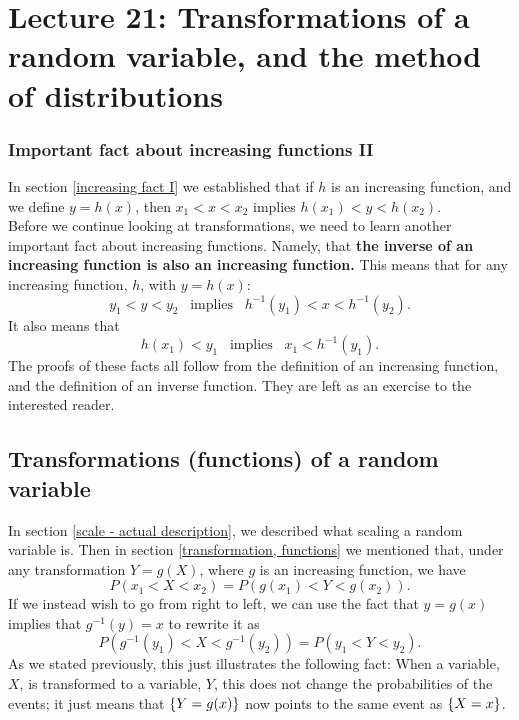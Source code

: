 
\chapter{Lecture 21: Transformations of a random variable, and the method of distributions}

\subsection{Important fact about increasing functions II} \label{increasing fact II}
In section \ref{increasing fact I} we established that if $h$ is an increasing function, and we define $y = h(x)$, then $x_1 < x < x_2$ implies $h(x_1) < y < h(x_2)$. \\

\noindent  Before we continue looking at transformations, we need to learn another important fact about increasing functions. Namely, that \textbf{the inverse of an increasing function is also an increasing function.} This means that for any increasing function, $h$, with $y = h(x)$:
\[
y_1 < y < y_2 \;\;\; \text{implies} \;\;\; h^{-1}(y_1) < x < h^{-1}(y_2).
\]
It also means that
\[
h(x_1) < y_1 \;\;\; \text{implies} \;\;\; x_1 < h^{-1}(y_1).
\]
The proofs of these facts all follow from the definition of an increasing function, and the definition of an inverse function. They are left as an exercise to the interested reader.

\section{Transformations (functions) of a random variable} \label{sec21.1}
In section \ref{scale - actual description}, we described what scaling a random variable is. Then in section \ref{transformation, functions} we mentioned that, under any transformation $Y = g(X)$, where $g$ is an increasing function, we have
\[
P(x_1 < X < x_2) = P(g(x_1) < Y < g(x_2)).
\]
If we instead wish to go from right to left, we can use the fact that $y = g(x)$ implies that $g^{-1}(y) = x$ to rewrite it as
\[
P(g^{-1}(y_1) < X < g^{-1}(y_2)) = P(y_1 < Y < y_2).
\]
As we stated previously, this just illustrates the following fact: When a variable, $X$, is transformed to a variable, $Y$, this does not change the probabilities of the events; it just means that $\left\{Y = g(x)\right\}$ now points to the same event as $\left\{X = x\right\}$. \\

